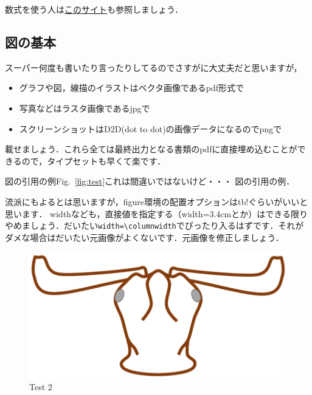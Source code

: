 \documentclass[a4j]{jsarticle}
\numberwithin{equation}{section}%
\begin{document}
数式を使う人は\href{http://www.math.tohoku.ac.jp/~kuroki/LaTeX/howtolatex.html}{このサイト}も参照しましょう．


\subsection{図の基本}

スーパー何度も書いたり言ったりしてるのでさすがに大丈夫だと思いますが，
\begin{itemize}
 \item グラフや図，線描のイラストはベクタ画像であるpdf形式で
 \item 写真などはラスタ画像であるjpgで
 \item スクリーンショットはD2D(dot to dot)の画像データになるのでpngで
\end{itemize}
載せましょう．これら全ては最終出力となる書類のpdfに直接埋め込むことができるので，タイプセットも早くて楽です．

図の引用の例Fig.~\ref{fig:test}これは間違いではないけど・・・
図の引用の例．%

流派にもよるとは思いますが，figure環境の配置オプションはtb!ぐらいがいいと思います．
widthなども，直接値を指定する（width=3.4cmとか）はできる限りやめましょう．だいたい\verb#width=\columnwidth#でぴったり入るはずです．それがダメな場合はだいたい元画像がよくないです．元画像を修正しましょう．

\begin{figure}[tb]
 \centering %
  \includegraphics[width=\columnwidth]{./figure/testfig2.pdf}
  \caption{Test 2}
  \label{fig:test2}
\end{figure}
\fi%
\end{document}
